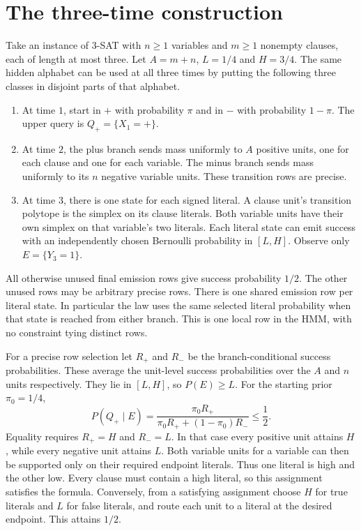 \documentclass[11pt,a4paper]{amsart}
\begin{document}
\section{The three-time construction}

Take an instance of 3-SAT with \(n\ge1\) variables and
\(m\ge1\) nonempty clauses, each of length at most three.
Let \(A=m+n\), \(L=1/4\) and \(H=3/4\). The same hidden
alphabet can be used at all three times by putting the
following three classes in disjoint parts of that alphabet.

\begin{enumerate}
\item At time \(1\), start in \(+\) with probability \(\pi\)
and in \(-\) with probability \(1-\pi\). The upper query is
\(Q_+=\{X_1=+\}\).
\item At time \(2\), the plus branch sends mass uniformly to \(A\)
positive units, one for each clause and one for each variable.
The minus branch sends mass uniformly to its \(n\) negative
variable units. These transition rows are precise.
\item At time \(3\), there is one state for each signed literal.
A clause unit's transition polytope is the simplex on its
clause literals. Both variable units have their own simplex
on that variable's two literals. Each literal state can emit
success with an independently chosen Bernoulli probability
in \([L,H]\). Observe only \(E=\{Y_3=1\}\).
\end{enumerate}

All otherwise unused final emission rows give success
probability \(1/2\). The other unused rows may be arbitrary
precise rows. There is one shared emission row per literal
state. In particular the law uses the same selected literal
probability when that state is reached from either branch.
This is one local row in the HMM, with no constraint tying
distinct rows.

For a precise row selection let \(R_+\) and \(R_-\) be the
branch-conditional success probabilities. These average the
unit-level success probabilities over the \(A\) and \(n\)
units respectively. They lie in \([L,H]\), so \(P(E)\ge L\).
For the starting prior \(\pi_0=1/4\),
\[
 P(Q_+\mid E)=
 \frac{\pi_0 R_+}{\pi_0 R_++(1-\pi_0)R_-}\le \frac12.
\]
Equality requires \(R_+=H\) and \(R_-=L\). In that case every
positive unit attains \(H\), while every negative unit
attains \(L\). Both variable units for a variable can then
be supported only on their required endpoint literals. Thus
one literal is high and the other low. Every clause must
contain a high literal, so this assignment satisfies the
formula. Conversely, from a satisfying assignment choose
\(H\) for true literals and \(L\) for false literals, and
route each unit to a literal at the desired endpoint.
This attains \(1/2\).
\end{document}
